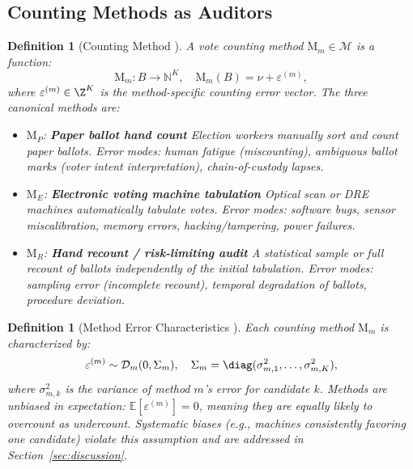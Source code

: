 \documentclass[11pt,a4paper]{article}
\newtheorem{definition}[theorem]{Definition}
\theoremstyle{definition}
\newcommand{\N}{\mathbb{N}}
\newcommand{\E}{\mathbb{E}}
\newcommand{\methodSet}{\mathcal{M}}
\newcommand{\method}[1]{\mathrm{M}_{#1}}
\begin{document}
\subsection{Counting Methods as Auditors}
\begin{definition}[Counting Method ]
\label{def:method}
A vote counting method $\method{m} \in \methodSet$ is a function:
\begin{equation}
    \method{m}: B \to \N^K, \quad \method{m}(B) = \nu + \varepsilon^{(m)},
    \label{eq:method}
\end{equation}
where $\varepsilon^{(m)} \in \Z^K$ is the method-specific counting error vector. The three canonical methods are:
\begin{itemize}
    \item $\method{P}$: \textbf{Paper ballot hand count} Election workers manually sort and count paper ballots. Error modes: human fatigue (miscounting), ambiguous ballot marks (voter intent interpretation), chain-of-custody lapses.
    \item $\method{E}$: \textbf{Electronic voting machine tabulation} Optical scan or DRE machines automatically tabulate votes. Error modes: software bugs, sensor miscalibration, memory errors, hacking/tampering, power failures.
    \item $\method{R}$: \textbf{Hand recount / risk-limiting audit} A statistical sample or full recount of ballots independently of the initial tabulation. Error modes: sampling error (incomplete recount), temporal degradation of ballots, procedure deviation.
\end{itemize}
\end{definition}
\begin{definition}[Method Error Characteristics ]
\label{def:error_chars}
Each counting method $\method{m}$ is characterized by:
\begin{equation}
    \varepsilon^{(m)} \sim \mathcal{D}_m(0, \Sigma_m), \quad \Sigma_m = \diag(\sigma_{m,1}^2, \ldots, \sigma_{m,K}^2),
    \label{eq:error_chars}
\end{equation}
where $\sigma_{m,k}^2$ is the variance of method $m$'s error for candidate $k$. Methods are unbiased in expectation: $\E[\varepsilon^{(m)}] = 0$, meaning they are equally likely to overcount as undercount. Systematic biases (e.g., machines consistently favoring one candidate) violate this assumption and are addressed in Section~\ref{sec:discussion}.
\end{definition}
\end{document}
